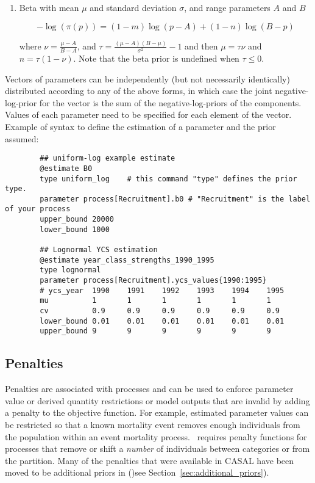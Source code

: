 \begin{enumerate}
\item{Beta with mean $\mu$ and standard deviation $\sigma$, and range parameters $A$ and $B$}

\begin{equation}
 - \log \left(\pi \left( p \right) \right) = \left( 1 - m \right) \log \left( p - A \right) + \left( 1 - n \right)\log \left( B - p \right)
\end{equation}

where $\nu  = \frac{\mu  - A}{B - A}$, and $\tau = \frac{\left(\mu -A \right)\left(B - \mu \right)}{\sigma ^2} - 1$ and then $\mu=\tau \nu$ and $n=\tau(1-\nu)$. Note that the beta prior is undefined when $\tau \leq 0$.

\end{enumerate}

Vectors of parameters can be independently (but not necessarily identically) distributed according to any of the above forms, in which case the joint negative-log-prior for the vector is the sum of the negative-log-priors of the components. Values of each parameter need to be specified for each element of the vector. Example of syntax to define the estimation of a parameter and the prior assumed:

{\small{\begin{verbatim}
		## uniform-log example estimate
		@estimate B0
		type uniform_log	# this command "type" defines the prior type.
		parameter process[Recruitment].b0 # "Recruitment" is the label of your process
		upper_bound 20000
		lower_bound 1000

		## Lognormal YCS estimation
		@estimate year_class_strengths_1990_1995
		type lognormal
		parameter process[Recruitment].ycs_values{1990:1995}
		# ycs_year  1990	1991	1992	1993	1994	1995
		mu   		1   	1   	1   	1   	1   	1
		cv 			0.9 	0.9 	0.9 	0.9 	0.9 	0.9
		lower_bound 0.01	0.01	0.01	0.01	0.01	0.01
		upper_bound 9		9		9		9		9		9

\end{verbatim}}}

\subsection{Penalties\label{sec:penalties}}

Penalties are associated with processes and can be used to enforce parameter value or derived quantity restrictions or model outputs that are invalid by adding a penalty to the objective function. For example, estimated parameter values can be restricted so that a known mortality event removes enough individuals from the population within an event mortality process. \CNAME\ requires penalty functions for processes that remove or shift a \emph{number} of individuals between categories or from the partition. Many of the penalties that were available in CASAL have been moved to be additional priors in \CNAME ()see Section~\ref{sec:additional_priors}).

